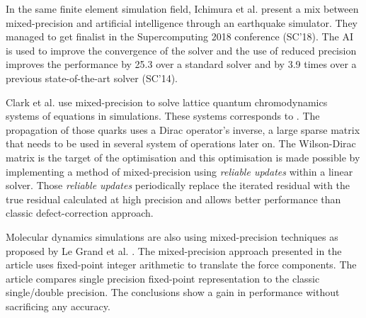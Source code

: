 In the same finite element simulation field, Ichimura et al. \cite{Ichimura2018} present a mix between mixed-precision and artificial intelligence through an earthquake simulator. They managed to get finalist in the Supercomputing 2018 conference (SC'18). The AI is used to improve the convergence of the solver and the use of reduced precision improves the performance by 25.3 over a standard solver and by 3.9 times over a previous state-of-the-art solver (SC'14).


Clark et al. \cite{Clark2010} use mixed-precision to solve lattice quantum chromodynamics systems of equations in simulations. These systems corresponds to . The propagation of those quarks uses a Dirac operator's inverse, a large sparse matrix that needs to be used in several system of operations later on. The Wilson-Dirac matrix is the target of the optimisation and this optimisation is made possible by implementing a method of mixed-precision using \emph{reliable updates} within a linear solver. Those \emph{reliable updates} periodically replace the iterated residual with the true residual calculated at high precision and allows better performance than classic defect-correction approach.


Molecular dynamics simulations are also using mixed-precision techniques as proposed by Le Grand et al. \cite{LeGrand2013}. The mixed-precision approach presented in the article uses fixed-point integer arithmetic to translate the force components. The article compares single precision fixed-point representation to the classic single/double precision. The conclusions show a gain in performance without sacrificing any accuracy.



